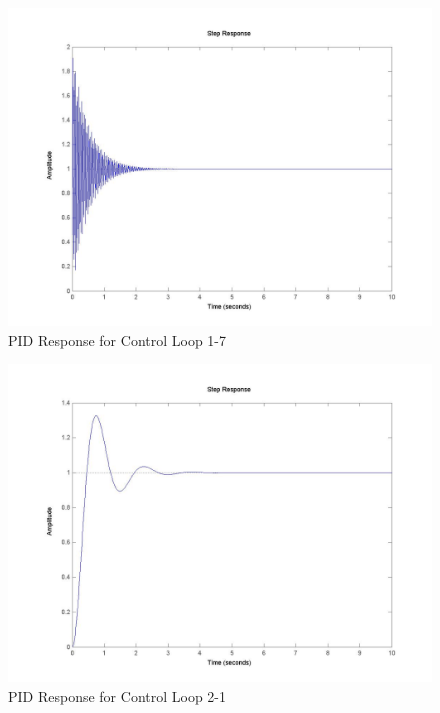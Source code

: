 	\begin{figure}[H]
		\includegraphics[width=\textwidth]{part1-7.jpg}
		\caption{PID Response for Control Loop 1-7}
	\end{figure}
	
	\begin{figure}[H]
		\includegraphics[width=\textwidth]{part2-1.jpg}
		\caption{PID Response for Control Loop 2-1}
	\end{figure}
	
